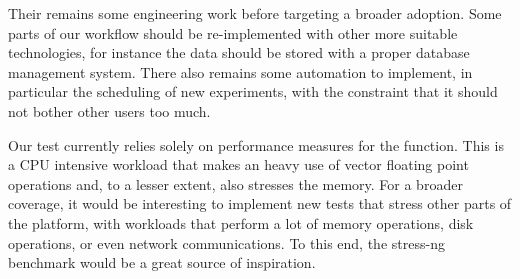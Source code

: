         Their remains some engineering work before targeting a broader adoption. Some parts of our workflow should be
        re-implemented with other more suitable technologies, for instance the data should be stored with a proper
        database management system. There also remains some automation to implement, in particular the scheduling of
        new experiments, with the constraint that it should not bother other users too much.

        Our test currently relies solely on performance measures for the \dgemm function. This is a CPU intensive
        workload that makes an heavy use of vector floating point operations and, to a lesser extent, also stresses the
        memory. For a broader coverage, it would be interesting to implement new tests that stress other parts of the
        platform, \eg with workloads that perform a lot of memory operations, disk operations, or even network
        communications. To this end, the stress-ng\cite{stress-ng} benchmark would be a great source of inspiration.
